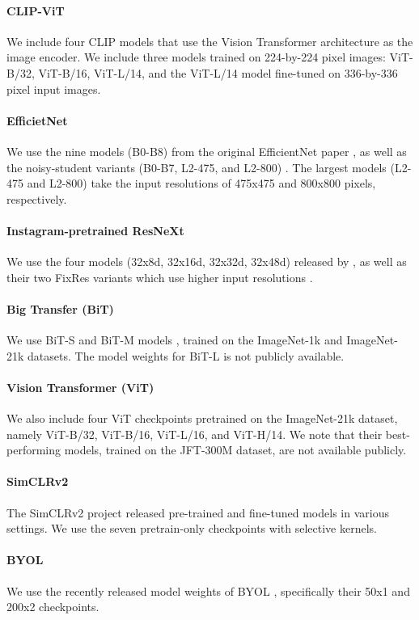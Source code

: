 \documentclass{article}
\begin{document}
\paragraph{CLIP-ViT} We include four CLIP models that use the Vision Transformer \cite{dosovitskiy2020image} architecture as the image encoder. We include three models trained on 224-by-224 pixel images: ViT-B/32, ViT-B/16, ViT-L/14, and the ViT-L/14 model fine-tuned on 336-by-336 pixel input images.
\paragraph{EfficietNet} We use the nine models (B0-B8) from the original EfficientNet paper \cite{tan2019efficientnet}, as well as the noisy-student variants (B0-B7, L2-475, and L2-800) \citep{tan2019efficientnet}. The largest models (L2-475 and L2-800) take the input resolutions of 475x475 and 800x800 pixels, respectively.
\paragraph{Instagram-pretrained ResNeXt} We use the four models (32x8d, 32x16d, 32x32d, 32x48d) released by \cite{mahajan2018exploring}, as well as their two FixRes variants which use higher input resolutions \cite{touvron2019fixing}.
\paragraph{Big Transfer (BiT)} We use BiT-S and BiT-M models \citep{kolesnikov2019large}, trained on the ImageNet-1k and ImageNet-21k datasets. The model weights for BiT-L is not publicly available.
\paragraph{Vision Transformer (ViT)} We also include four ViT \cite{dosovitskiy2020image} checkpoints pretrained on the ImageNet-21k dataset, namely ViT-B/32, ViT-B/16, ViT-L/16, and ViT-H/14. We note that their best-performing models, trained on the JFT-300M dataset, are not available publicly.
\paragraph{SimCLRv2} The SimCLRv2 \citep{chen2020big} project released pre-trained and fine-tuned models in various settings. We use the seven pretrain-only checkpoints with selective kernels.
\paragraph{BYOL} We use the recently released model weights of BYOL \citep{grill2020byol}, specifically their 50x1 and 200x2 checkpoints.
\end{document}

